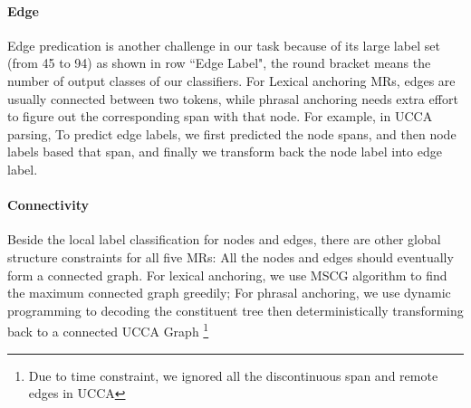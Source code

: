 \paragraph{Edge} Edge predication is another challenge in our task
because of its large label set (from 45 to 94) as shown in row ``Edge
Label", the round bracket means the number of output classes of our
classifiers. For Lexical anchoring MRs, edges are usually connected
between two tokens, while phrasal anchoring needs extra effort to
figure out the corresponding span with that node. For example, in UCCA
parsing, To predict edge labels, we first predicted the node spans,
and then node labels based that span, and finally we transform back
the node label into edge label.

\paragraph{Connectivity} Beside the local label classification for
nodes and edges, there are other global structure constraints for all
five MRs: All the nodes and edges should eventually form a connected
graph. For lexical anchoring, we use MSCG algorithm to find the
maximum connected graph greedily; For phrasal anchoring, we use
dynamic programming to decoding the constituent tree then
deterministically transforming back to a connected UCCA Graph
\footnote{Due to time
  constraint, we ignored all the discontinuous span and remote edges
  in UCCA}

